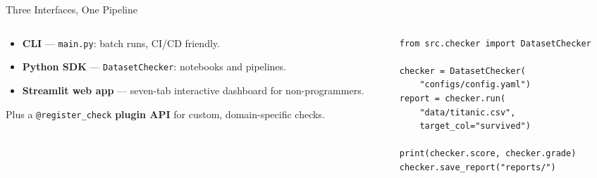 \documentclass[11pt,aspectratio=169]{beamer}
\begin{document}
\begin{frame}[fragile]{Three Interfaces, One Pipeline}
  \begin{columns}[T]
    \begin{column}{0.42\textwidth}
      \begin{itemize}\setlength\itemsep{0.7em}
        \item \textbf{CLI} --- \texttt{main.py}: batch runs, CI/CD friendly.
        \item \textbf{Python SDK} --- \texttt{DatasetChecker}: notebooks and pipelines.
        \item \textbf{Streamlit web app} --- seven-tab interactive dashboard for non-programmers.
      \end{itemize}
      \vspace{0.5em}
      \footnotesize Plus a \texttt{@register\_check} \textbf{plugin API} for custom, domain-specific checks.
    \end{column}
    \begin{column}{0.56\textwidth}
\begin{lstlisting}
from src.checker import DatasetChecker

checker = DatasetChecker(
    "configs/config.yaml")
report = checker.run(
    "data/titanic.csv",
    target_col="survived")

print(checker.score, checker.grade)
checker.save_report("reports/")
\end{lstlisting}
    \end{column}
  \end{columns}
\end{frame}
\end{document}
